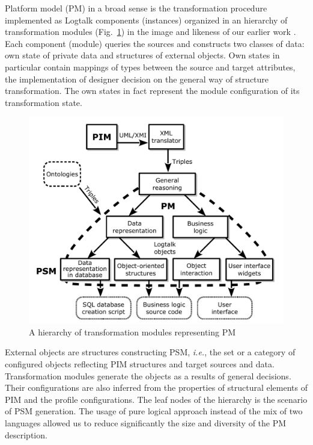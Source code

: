 \documentclass[conference,a4paper]{IEEEtran}
\begin{document}
Platform model (PM) in a broad sense is the transformation procedure implemented as Logtalk components (instances) organized in an hierarchy of transformation modules (Fig.~\ref{fig:modules}) in the image and likeness of our earlier work \cite{tereh1}.  Each component (module) queries the sources and constructs two classes of data: own state of private data and structures of external objects.  Own states in particular contain mappings of types between the source and target attributes, the implementation of designer decision on the general way of structure transformation.  The own states in fact represent the module configuration of its transformation state.

\begin{figure}[t]
  \centering
  \includegraphics[width=1\linewidth]{architect_tree_pres-en-wo-OCL.pdf}
  \caption{A hierarchy of transformation modules representing PM}
  \label{fig:modules}
\end{figure}

External objects are structures constructing PSM, \emph{i.e.}, the set or a category of configured objects reflecting PIM structures and target sources and data.  Transformation modules generate the objects as a results of general decisions.  Their configurations are also inferred from the properties of structural elements of PIM and the profile configurations.  The leaf nodes of the hierarchy is the scenario of PSM generation.  The usage of pure logical approach instead of the mix of two languages allowed us to reduce significantly the size and diversity of the PM description.
\end{document}
